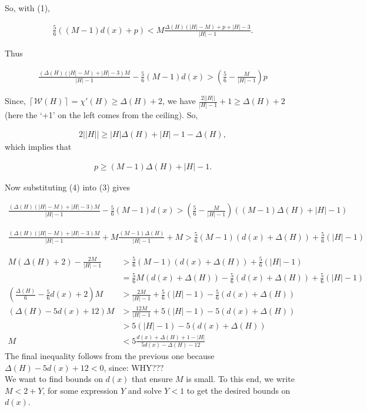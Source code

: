 \documentclass[12pt]{amsart}
\theoremstyle{plain}
\theoremstyle{definition}
\theoremstyle{remark}
\newcommand{\fancy}[1]{\mathcal{#1}}
\newcommand{\W}{\fancy{W}}
\newcommand{\ceil}[1]{\left\lceil#1\right\rceil}
\begin{document}
So, with (1),

\begin{align*}
 \frac56((M-1)d(x) + p) <  M\frac{\Delta(H)(|H| - M) + p + |H| - 3}{|H|-1}.
\end{align*}

Thus

\begin{align}
\frac{(\Delta(H)(|H| - M) + |H| - 3)M}{|H| - 1} - \frac56(M-1)d(x) > \left(\frac56 -
\frac{M}{|H| - 1}\right)p
\end{align}

Since,
$\ceil{\W(H)} = \chi'(H) \ge \Delta(H) + 2$, we have
$\frac{2||H||}{|H| - 1} + 1 \ge \Delta(H) + 2$ (here the `+1' on the left comes
from the ceiling).
So,

\begin{align*}
2||H|| \ge |H|\Delta(H) + |H| - 1 - \Delta(H),
\end{align*}
which implies that

\begin{align}
p \ge (M-1)\Delta(H) + |H| - 1.
\end{align}

Now substituting (4) into (3) gives

\begin{align*}
\frac{(\Delta(H)(|H| - M) + |H| - 3)M}{|H| - 1} - \frac56(M-1)d(x) > \left(\frac56 -
\frac{M}{|H| - 1}\right)((M-1)\Delta(H) + |H| - 1)
\end{align*}

\begin{align*}
\frac{(\Delta(H)(|H| - M) + |H| - 3)M}{|H| - 1} + M\frac{(M-1)\Delta(H) %
}{|H| - 1}+M > \frac56(M-1)(d(x) + \Delta(H)) + \frac56(|H| - 1)
\end{align*}

\begin{align*}
M(\Delta(H) + 2) - \frac{2M}{|H| - 1} &>  \frac56(M-1)(d(x) + \Delta(H)) + \frac56(|H|
- 1) \\
&= \frac56M(d(x) + \Delta(H)) - \frac56(d(x) + \Delta(H)) + \frac56(|H| - 1)\\
\left(\frac{\Delta(H)}6 - \frac56d(x) + 2\right)M &> \frac{2M}{|H| - 1} + 
\frac56(|H| - 1) - \frac56(d(x) + \Delta(H))\\
(\Delta(H) - 5d(x) + 12)M &> \frac{12M}{|H| - 1} +  5(|H| - 1) - 5(d(x) +
\Delta(H))\\ & > 5(|H| - 1) - 5(d(x) + \Delta(H))\\
M &< 5\frac{d(x) + \Delta(H) + 1 - |H|}{5d(x) - \Delta(H) - 12}
\end{align*}
The final inequality follows from the previous one because
$\Delta(H)-5d(x)+12<0$, since: WHY???\\
We want to find bounds on $d(x)$ that ensure $M$ is small.  To this end, we
write $M<2+Y$, for some expression $Y$ and solve $Y<1$ to get the desired bounds
on $d(x)$.
\end{document}
